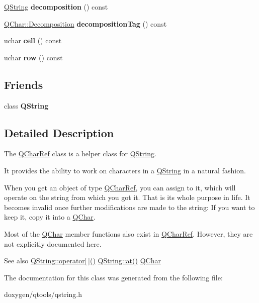 \begin{DoxyCompactItemize}
\mbox{\hyperlink{class_q_string}{Q\+String}} {\bfseries decomposition} () const
\item 
\mbox{\label{class_q_char_ref_a2ea8798686bcd2f5ad8325d2b21aaf1a}} 
\mbox{\hyperlink{class_q_char_a13be45046e82a6d2991cef0b7c18d522}{Q\+Char\+::\+Decomposition}} {\bfseries decomposition\+Tag} () const
\item 
\mbox{\label{class_q_char_ref_a94ab7dc56d7034e4e9d6c40e80d3eed5}} 
uchar {\bfseries cell} () const
\item 
\mbox{\label{class_q_char_ref_aaa1187b558da31de0faf48bc642cfc15}} 
uchar {\bfseries row} () const
\end{DoxyCompactItemize}
\subsection*{Friends}
\begin{DoxyCompactItemize}
\item 
\mbox{\label{class_q_char_ref_a9e1fc451dd8095b29e730972a34bad70}} 
class {\bfseries Q\+String}
\end{DoxyCompactItemize}


\subsection{Detailed Description}
The \mbox{\hyperlink{class_q_char_ref}{Q\+Char\+Ref}} class is a helper class for \mbox{\hyperlink{class_q_string}{Q\+String}}. 

It provides the ability to work on characters in a \mbox{\hyperlink{class_q_string}{Q\+String}} in a natural fashion.

When you get an object of type \mbox{\hyperlink{class_q_char_ref}{Q\+Char\+Ref}}, you can assign to it, which will operate on the string from which you got it. That is its whole purpose in life. It becomes invalid once further modifications are made to the string\+: If you want to keep it, copy it into a \mbox{\hyperlink{class_q_char}{Q\+Char}}.

Most of the \mbox{\hyperlink{class_q_char}{Q\+Char}} member functions also exist in \mbox{\hyperlink{class_q_char_ref}{Q\+Char\+Ref}}. However, they are not explicitly documented here.

\begin{DoxySeeAlso}{See also}
\mbox{\hyperlink{class_q_string_a2568867dc7f994e05c0e582fc510bbc2}{Q\+String\+::operator\mbox{[}$\,$\mbox{]}()}} \mbox{\hyperlink{class_q_string_a5e35837892a410c0396af0cb5cd4a517}{Q\+String\+::at()}} \mbox{\hyperlink{class_q_char}{Q\+Char}} 
\end{DoxySeeAlso}


The documentation for this class was generated from the following file\+:\begin{DoxyCompactItemize}
\item 
doxygen/qtools/qstring.\+h\end{DoxyCompactItemize}
